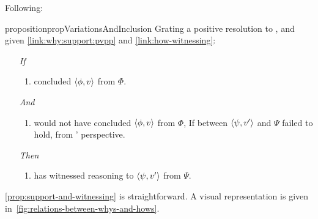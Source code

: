 \begin{note}
 Following:

  \begin{restatable}[]{proposition}{propVariationsAndInclusion}
    \label{prop:support-and-witnessing}
    Grating a positive resolution to \issueInclusion{}, and given \autoref{link:why:support:pvpp} and \autoref{link:how-witnessing}:
    \begin{enumerate}
    \item[\emph{If}]
      \begin{enumerate}[label=\alph*., ref=(\alph*)]
      \item \vAgent{} concluded \(\langle \phi, v \rangle\) from \(\Phi\).
      \end{enumerate}
    \item[\emph{And}]
      \begin{enumerate}[label=\alph*., ref=(\alph*), resume]
      \item
        \vAgent{} would not have concluded \(\langle \phi, v \rangle\) from \(\Phi\), If \support{} between \(\langle \psi, v' \rangle\) and \(\Psi\) failed to hold, from \vAgent{}' perspective.
      \end{enumerate}
    \item[\emph{Then}]
      \begin{enumerate}[label=\alph*., ref=(\alph*), resume]
      \item
        \vAgent{} has witnessed reasoning to \(\langle \psi, v' \rangle\) from \(\Psi\).
      \end{enumerate}
    \end{enumerate}
  \end{restatable}

  \autoref{prop:support-and-witnessing} is straightforward.
  A visual representation is given in~\autoref{fig:relations-between-whys-and-hows}.
\end{note}

